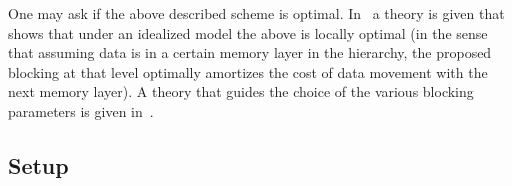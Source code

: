 One may ask if the above described scheme is optimal.  In~\cite{ITXGEMM:ICCS01} a theory is given that shows that under an idealized model the above is locally optimal (in the sense that assuming data is in a certain memory layer in the hierarchy, the proposed blocking at that level optimally amortizes the cost of data movement with the next memory layer).  A theory that guides the choice of the various blocking parameters is given in~\cite{BLIS4}.

\subsection{Setup}

\begin{figure}[tb!]
	\begin{center}
\begin{minipage}{4in}
\end{minipage}
\end{center}
\end{figure}
